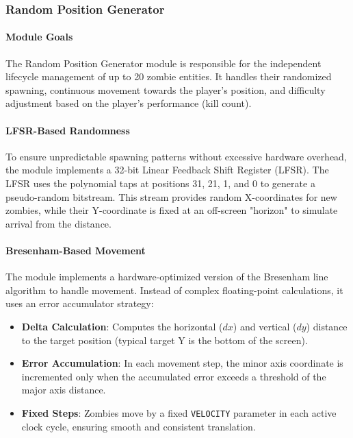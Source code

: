 \documentclass[12pt,a4paper]{article}
\begin{document}
\subsubsection{Random Position Generator}

\paragraph{Module Goals}
The Random Position Generator module is responsible for the independent lifecycle management of up to 20 zombie entities. It handles their randomized spawning, continuous movement towards the player's position, and difficulty adjustment based on the player's performance (kill count).

\paragraph{LFSR-Based Randomness}
To ensure unpredictable spawning patterns without excessive hardware overhead, the module implements a 32-bit Linear Feedback Shift Register (LFSR). The LFSR uses the polynomial taps at positions 31, 21, 1, and 0 to generate a pseudo-random bitstream. This stream provides random X-coordinates for new zombies, while their Y-coordinate is fixed at an off-screen "horizon" to simulate arrival from the distance.

\paragraph{Bresenham-Based Movement}
The module implements a hardware-optimized version of the Bresenham line algorithm to handle movement. Instead of complex floating-point calculations, it uses an error accumulator strategy:
\begin{itemize}
    \item \textbf{Delta Calculation}: Computes the horizontal ($dx$) and vertical ($dy$) distance to the target position (typical target Y is the bottom of the screen).
    \item \textbf{Error Accumulation}: In each movement step, the minor axis coordinate is incremented only when the accumulated error exceeds a threshold of the major axis distance.
    \item \textbf{Fixed Steps}: Zombies move by a fixed \texttt{VELOCITY} parameter in each active clock cycle, ensuring smooth and consistent translation.
\end{itemize}
\end{document}
